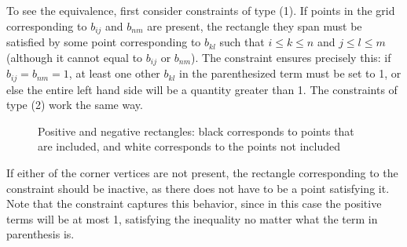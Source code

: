 \documentclass[11pt]{article}
\begin{document}
To see the equivalence, first consider constraints of type (1). If points in the grid corresponding to $b_{ij}$ and $b_{nm}$ are present, the rectangle they span must be satisfied by some point corresponding to $b_{kl}$ such that   $i\leq k \leq n$ and $j \leq l \leq m$ (although it cannot equal to $b_{ij}$ or $b_{nm}$). The constraint ensures precisely this: if $b_{ij} = b_{nm} = 1$, at least one other $b_{kl}$ in the parenthesized term must be set to 1, or else the entire left hand side will be a quantity greater than 1. The constraints of type (2) work the same way.

\begin{figure}
\centering
{}
\caption{Positive and negative rectangles: black corresponds to points that are included, and white corresponds to the points not included}
\label{fig:rectangles}
\end{figure}

If either of the corner vertices are not present, the rectangle corresponding to the constraint should be inactive, as there does not have to be a point satisfying it. Note that the constraint captures this behavior, since in this case the positive terms will be at most 1, satisfying the inequality no matter what the term in parenthesis is.
\end{document}
